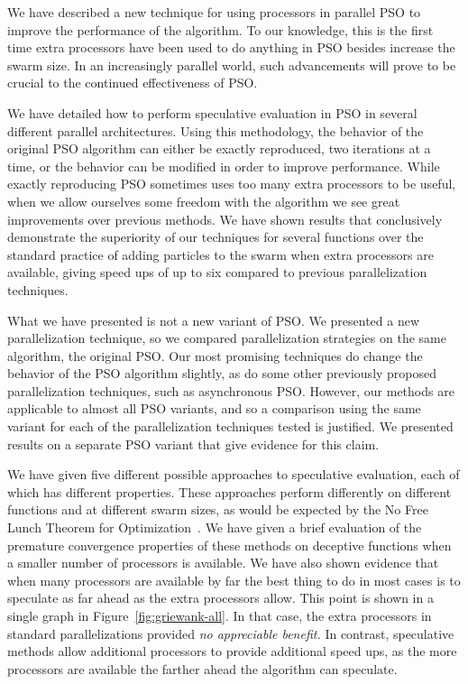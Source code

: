 \documentclass[smallcondensed]{svjour3}
\newcommand{\fig}[1]{Figure~\ref{fig:#1}}
\begin{document}
We have described a new technique for using processors in parallel PSO to
improve the performance of the algorithm.  To our knowledge, this is the first
time extra processors have been used to do anything in PSO besides increase the
swarm size.  In an increasingly parallel world, such advancements will prove to
be crucial to the continued effectiveness of PSO.

We have detailed how to perform speculative evaluation in PSO in several
different parallel architectures.  Using this methodology, the behavior of the
original PSO algorithm can either be exactly reproduced, two iterations at a
time, or the behavior can be modified in order to improve performance.  While
exactly reproducing PSO sometimes uses too many extra processors to be useful,
when we allow ourselves some freedom with the algorithm we see great
improvements over previous methods.  We have shown results that conclusively
demonstrate the superiority of our techniques for several functions over the
standard practice of adding particles to the swarm when extra processors are
available, giving speed ups of up to six compared to previous parallelization
techniques.

What we have presented is not a new variant of PSO.  We presented a new
parallelization technique, so we compared parallelization strategies on the
same algorithm, the original PSO.  Our most promising techniques do change the
behavior of the PSO algorithm slightly, as do some other previously proposed
parallelization techniques, such as asynchronous PSO.  However, our methods are
applicable to almost all PSO variants, and so a comparison using the same
variant for each of the parallelization techniques tested is justified.  We
presented results on a separate PSO variant that give evidence for this claim.

We have given five different possible approaches to speculative evaluation,
each of which has different properties.  These approaches perform differently
on different functions and at different swarm sizes, as would be expected by
the No Free Lunch Theorem for
Optimization~\citep{wolpert-1997-nfl-for-optimization}.  We have given a brief
evaluation of the premature convergence properties of these methods on
deceptive functions when a smaller number of processors is available.  We have
also shown evidence that when many processors are available by far the best
thing to do in most cases is to speculate as far ahead as the extra processors
allow.  This point is shown in a single graph in \fig{griewank-all}.  In that
case, the extra processors in standard parallelizations provided \emph{no
appreciable benefit.}  In contrast, speculative methods allow additional
processors to provide additional speed ups, as the more processors are
available the farther ahead the algorithm can speculate.
\end{document}
